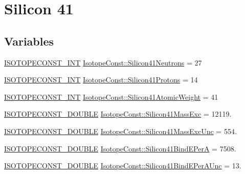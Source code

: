 \hypertarget{group___isotope_const-_silicon-_si41}{}\section{Silicon 41}
\label{group___isotope_const-_silicon-_si41}
\subsection*{Variables}
\begin{DoxyCompactItemize}
\item 
\mbox{\hyperlink{group___isotope_const-_macros_ga5f18360b3e99483a35c32d789e62621c}{I\+S\+O\+T\+O\+P\+E\+C\+O\+N\+S\+T\+\_\+\+I\+NT}} \mbox{\hyperlink{group___isotope_const-_silicon-_si41_gaba43c6ff4dcd6c4170b66116fb0302aa}{Isotope\+Const\+::\+Silicon41\+Neutrons}} = 27
\item 
\mbox{\hyperlink{group___isotope_const-_macros_ga5f18360b3e99483a35c32d789e62621c}{I\+S\+O\+T\+O\+P\+E\+C\+O\+N\+S\+T\+\_\+\+I\+NT}} \mbox{\hyperlink{group___isotope_const-_silicon-_si41_gade352697f75e51c8f4f17a59abbbb9ae}{Isotope\+Const\+::\+Silicon41\+Protons}} = 14
\item 
\mbox{\hyperlink{group___isotope_const-_macros_ga5f18360b3e99483a35c32d789e62621c}{I\+S\+O\+T\+O\+P\+E\+C\+O\+N\+S\+T\+\_\+\+I\+NT}} \mbox{\hyperlink{group___isotope_const-_silicon-_si41_gac1082f4fffc39f49f3739ecf6b4cab50}{Isotope\+Const\+::\+Silicon41\+Atomic\+Weight}} = 41
\item 
\mbox{\hyperlink{group___isotope_const-_macros_ga8f45a7272ce02c0b4c65c44636ed719a}{I\+S\+O\+T\+O\+P\+E\+C\+O\+N\+S\+T\+\_\+\+D\+O\+U\+B\+LE}} \mbox{\hyperlink{group___isotope_const-_silicon-_si41_gac45bc95b626d4ece30e62665ed603b64}{Isotope\+Const\+::\+Silicon41\+Mass\+Exc}} = 12119.
\item 
\mbox{\hyperlink{group___isotope_const-_macros_ga8f45a7272ce02c0b4c65c44636ed719a}{I\+S\+O\+T\+O\+P\+E\+C\+O\+N\+S\+T\+\_\+\+D\+O\+U\+B\+LE}} \mbox{\hyperlink{group___isotope_const-_silicon-_si41_ga679af1fa8105957018b608b566567dc5}{Isotope\+Const\+::\+Silicon41\+Mass\+Exc\+Unc}} = 554.
\item 
\mbox{\hyperlink{group___isotope_const-_macros_ga8f45a7272ce02c0b4c65c44636ed719a}{I\+S\+O\+T\+O\+P\+E\+C\+O\+N\+S\+T\+\_\+\+D\+O\+U\+B\+LE}} \mbox{\hyperlink{group___isotope_const-_silicon-_si41_ga046c35c2aa7db7848a52aa1d8341d74a}{Isotope\+Const\+::\+Silicon41\+Bind\+E\+PerA}} = 7508.
\item 
\mbox{\hyperlink{group___isotope_const-_macros_ga8f45a7272ce02c0b4c65c44636ed719a}{I\+S\+O\+T\+O\+P\+E\+C\+O\+N\+S\+T\+\_\+\+D\+O\+U\+B\+LE}} \mbox{\hyperlink{group___isotope_const-_silicon-_si41_gabf1bbf647b4854d790c2d40780f54e0f}{Isotope\+Const\+::\+Silicon41\+Bind\+E\+Per\+A\+Unc}} = 13.

\end{DoxyCompactItemize}
